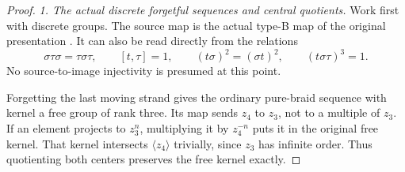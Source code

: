 \begin{proof}
\emph{1. The actual discrete forgetful sequences and central quotients.}
Work first with discrete groups. The source map is the actual
type-B map of the original presentation
\citep[\S1.2 and Proposition~2.20(1)]{A_Enriquez2014}.
It can also be read directly from the relations
\[
 \sigma\tau\sigma=\tau\sigma\tau,\qquad
 [t,\tau]=1,\qquad (t\sigma)^2=(\sigma t)^2,
 \qquad (t\sigma\tau)^3=1.
 \tag{A.134.6}
\]
No source-to-image injectivity is presumed at this point.

Forgetting the last moving strand gives the ordinary pure-braid
sequence with kernel a free group of rank three.
Its map sends \(z_4\) to \(z_3\), not to a multiple of \(z_3\).
If an element projects to \(z_3^n\), multiplying it by
\(z_4^{-n}\) puts it in the original free kernel. That kernel
intersects \(\langle z_4\rangle\) trivially, since \(z_3\) has
infinite order. Thus quotienting both centers preserves the
free kernel exactly.


\end{proof}
